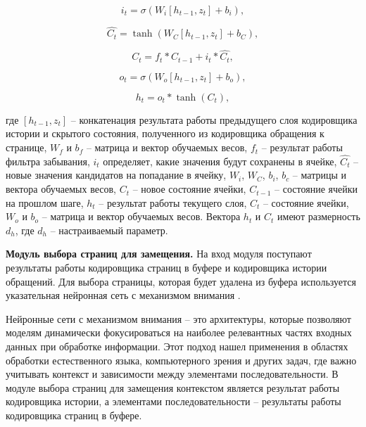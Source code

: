 \begin{equation}\label{formula:lstm_enc_2}
	i_t = \sigma(W_i[h_{t-1}, z_t] + b_i),
\end{equation}

\begin{equation}\label{formula:lstm_enc_3}
	\hat{C_t} = \tanh(W_C[h_{t-1}, z_t] + b_C),
\end{equation}

\begin{equation}\label{formula:lstm_enc_4}
	C_t = f_t * C_{t-1} + i_t*\hat{C_t},
\end{equation}

\begin{equation}\label{formula:lstm_enc_5}
	o_t = \sigma(W_o[h_{t-1}, z_t] + b_o),
\end{equation}

\begin{equation}\label{formula:lstm_enc_6}
	h_t = o_t * \tanh(C_t),
\end{equation}

где $[h_{t-1}, z_t]$ -- конкатенация результата работы предыдущего слоя кодировщика истории и скрытого состояния, полученного из кодировщика обращения к странице, $W_f$ и $b_f$ -- матрица и вектор обучаемых весов, $f_t$ -- результат работы фильтра забывания, $i_t$ определяет, какие значения будут сохранены в ячейке, $\hat{C_t}$ -- новые значения кандидатов на попадание в ячейку, $W_i$, $W_C$, $b_i$, $b_c$ -- матрицы и вектора обучаемых весов, $C_t$ -- новое состояние ячейки, $C_{t-1}$ -- состояние ячейки на прошлом шаге, $h_t$ -- результат работы текущего слоя, $C_t$ -- состояние ячейки, $W_o$ и $b_o$ -- матрица и вектор обучаемых весов.
Вектора $h_t$ и $C_t$ имеют размерность $d_h$, где $d_h$ -- настраиваемый параметр.

\textbf{Модуль выбора страниц для замещения.}
На вход модуля поступают результаты работы кодировщика страниц в буфере и кодировщика истории обращений.
Для выбора страницы, которая будет удалена из буфера используется указательная нейронная сеть с механизмом внимания \cite{vinyals2015pointer}.

Нейронные сети с механизмом внимания -- это архитектуры, которые позволяют моделям динамически фокусироваться на наиболее релевантных частях входных данных при обработке информации.
Этот подход нашел применения в областях обработки естественного языка, компьютерного зрения и других задач, где важно учитывать контекст и зависимости между элементами последовательности.
В модуле выбора страниц для замещения контекстом является результат работы кодировщика истории, а элементами последовательности -- результаты работы кодировщика страниц в буфере.

